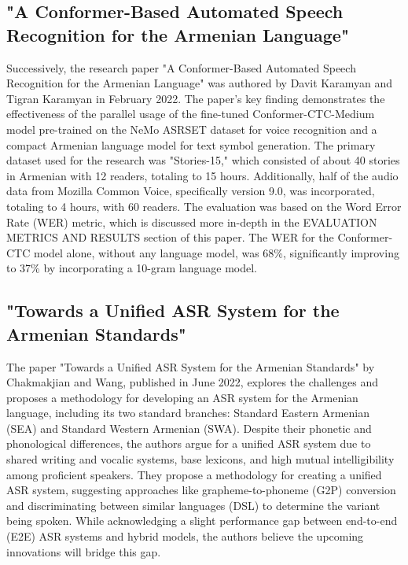 \documentclass[conference]{IEEEtran}
\begin{document}
\subsection{"A Conformer-Based Automated Speech Recognition for the Armenian Language" \cite{Karamyan_Davit_A}}
Successively, the research paper "A Conformer-Based Automated Speech Recognition for the Armenian Language" was authored by Davit Karamyan and Tigran Karamyan in February 2022. The paper's key finding demonstrates the effectiveness of the parallel usage of the fine-tuned Conformer-CTC-Medium model pre-trained on the NeMo ASRSET dataset for voice recognition and a compact Armenian language model for text symbol generation. The primary dataset used for the research was "Stories-15," which consisted of about 40 stories in Armenian with 12 readers, totaling to 15 hours. Additionally, half of the audio data from Mozilla Common Voice, specifically version 9.0, was incorporated, totaling to 4 hours, with 60 readers. The evaluation was based on the Word Error Rate (WER) metric, which is discussed more in-depth in the EVALUATION METRICS AND RESULTS section of this paper. The WER for the Conformer-CTC model alone, without any language model, was 68\%, significantly improving to 37\% by incorporating a 10-gram language model. 

\subsection{"Towards a Unified ASR System for the Armenian Standards" \cite{chakmakjian-wang-2022-towards}}
The paper "Towards a Unified ASR System for the Armenian Standards" by Chakmakjian and Wang, published in June 2022, explores the challenges and proposes a methodology for developing an ASR system for the Armenian language, including its two standard branches: Standard Eastern Armenian (SEA) and Standard Western Armenian (SWA). Despite their phonetic and phonological differences, the authors argue for a unified ASR system due to shared writing and vocalic systems, base lexicons, and high mutual intelligibility among proficient speakers. They propose a methodology for creating a unified ASR system, suggesting approaches like grapheme-to-phoneme (G2P) conversion and discriminating between similar languages (DSL) to determine the variant being spoken. While acknowledging a slight performance gap between end-to-end (E2E) ASR systems and hybrid models, the authors believe the upcoming innovations will bridge this gap. 
\end{document}
